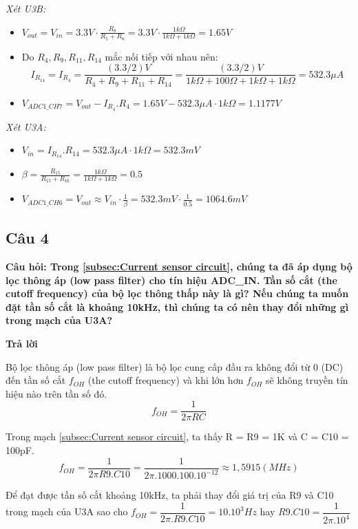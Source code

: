 \textit{Xét U3B:}
\begin{itemize}
    \item $V_{out} = V_{in} = 3.3V \cdot \frac{R_8}{R_5 + R_8} = 3.3V \cdot \frac{1k\Omega}{1k\Omega + 1k\Omega} = 1.65V$
    \item Do $R_4, R_9, R_{11}, R_{14}$ mắc nối tiếp với nhau nên: \[I_{R_{14}} = I_{R_4} = \frac{(3.3 / 2) V}{R_4 + R_9 + R_{11} + R_{14}} = \frac{(3.3 / 2) V}{1k\Omega + 100\Omega + 1k\Omega + 1k\Omega} = 532.3 \mu A \]
    \item $V_{ADC1\_CH7} = V_{out} - I_{R_4}.R_4 = 1.65V  - 532.3 \mu A \cdot 1k\Omega = 1.1177V$
\end{itemize}
\textit{Xét U3A:}
\begin{itemize}
    \item $V_{in} = I_{R_{14}}.R_{14} = 532.3 \mu A \cdot 1k\Omega = 532.3mV$
    \item $\beta = \frac{R_{15}}{R_{15} + R_{16}} = \frac{1k\Omega}{1k\Omega + 1k\Omega} = 0.5$
    \item $V_{ADC1\_CH6} = V_{out} \approx V_{in} \cdot \frac{1}{\beta} = 532.3mV \cdot \frac{1}{0.5} = 1064.6mV$
\end{itemize}
\pagebreak
\subsection{Câu 4}
\textbf{Câu hỏi: Trong \ref{subsec:Current sensor circuit}, chúng ta đã áp dụng bộ lọc thông áp (low pass filter) cho tín hiệu ADC\_IN. Tần số cắt (the cutoff frequency) của bộ lọc thông thấp này là gì? Nếu chúng ta muốn đặt tần số cắt là khoảng 10kHz, thì
chúng ta có nên thay đổi những gì trong mạch của U3A?}

\textbf{Trả lời}

Bộ lọc thông áp (low pass filter) là bộ lọc cung cấp đầu ra không đổi từ 0 (DC) đến tần số cắt $f_{OH}$ (the cutoff frequency) và khi lớn hơn $f_{OH}$ sẽ
không truyền tín hiệu nào trên tần số đó.
\[f_{OH} = \dfrac{1}{2\pi RC}\]

Trong mạch \ref{subsec:Current sensor circuit}, ta thấy R = R9 = 1K và C = C10 = 100pF.
\[f_{OH} = \dfrac{1}{2\pi R9.C10} = \dfrac{1}{2\pi .1000.100.10^{-12}} \approx 1,5915 (MHz)\]

Để đạt được tần số cắt khoảng 10kHz, ta phải thay đổi giá trị của R9 và C10 trong mạch của U3A sao cho $ f_{OH} = \dfrac{1}{2\pi.R9.C10} = 10.10^3 Hz$ hay $ R9.C10 = \dfrac{1}{2\pi.10^4}$
\pagebreak

